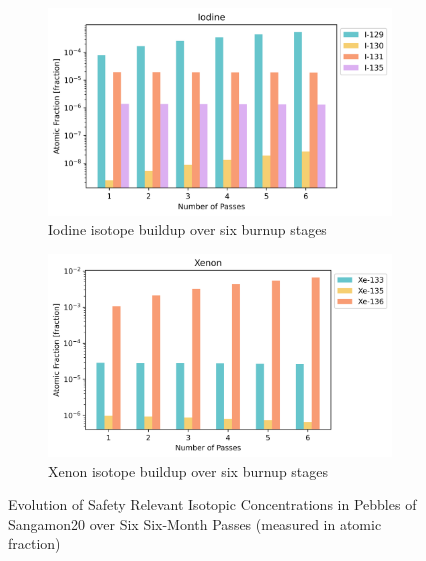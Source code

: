 \begin{figure}[H]
\centering
%
\begin{subfigure}{0.95\textwidth}
  \includegraphics[width=\linewidth]{figures/compositions/iodine}
  \caption{Iodine isotope buildup over six burnup stages}
  \label{fig:i}
\end{subfigure}%

\begin{subfigure}{0.95\textwidth}
  \includegraphics[width=\linewidth]{figures/compositions/xenon}
  \caption{Xenon isotope buildup over six burnup stages}
  \label{fig:xe}
\end{subfigure}%

\caption[Evolution of Safety Relevant Isotopic Concentrations in Pebbles of Sangamon20 over Six Six-Month Passes]{Evolution of Safety Relevant Isotopic Concentrations in Pebbles of Sangamon20 over Six Six-Month Passes (measured in atomic fraction)}
\end{figure}

